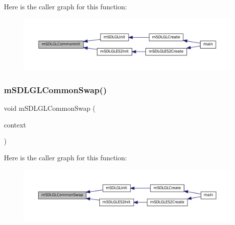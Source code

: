Here is the caller graph for this function\+:
\nopagebreak
\begin{figure}[H]
\begin{center}
\leavevmode
\includegraphics[width=350pt]{gl-common_8h_a0e50f5587724b819f700b4e7efcec813_icgraph}
\end{center}
\end{figure}
\mbox{\label{gl-common_8h_ae4d176ceb2ea06fadb56334f1022586e}} 
\subsubsection{\texorpdfstring{m\+S\+D\+L\+G\+L\+Common\+Swap()}{mSDLGLCommonSwap()}}
{\footnotesize\ttfamily void m\+S\+D\+L\+G\+L\+Common\+Swap (\begin{DoxyParamCaption}\item[{struct \mbox{\hyperlink{struct_video_backend}{Video\+Backend}} $\ast$}]{context }\end{DoxyParamCaption})}

Here is the caller graph for this function\+:
\nopagebreak
\begin{figure}[H]
\begin{center}
\leavevmode
\includegraphics[width=350pt]{gl-common_8h_ae4d176ceb2ea06fadb56334f1022586e_icgraph}
\end{center}
\end{figure}
\mbox{\label{gl-common_8h_a85812103de7937a9b1affd22665bd01c}} 
